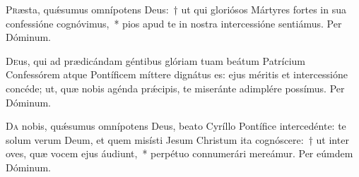 \documentclass[vesperale_romanum.tex]{subfiles}
\begin{document}
\myrule


\semiduplex


\oratio

\lettrine{P}{r}æsta, quǽsumus omnípotens Deus:~† ut qui gloriósos Mártyres fortes in sua confessióne cognóvimus,~* pios apud te in nostra intercessióne sentiámus. Per Dóminum.

\commferiae

\myrule


\duplex


\oratio

\commferiae

\myrule

\newpage


\duplex

\oratio

\lettrine{D}{e}us, qui ad prædicándam géntibus glóriam tuam beátum Patrícium Confessórem atque Pontíficem míttere dignátus es: ejus méritis et intercessióne concéde; ut, quæ nobis agénda prǽcipis, te miseránte adimplére possímus. Per Dóminum.

\commferiae

\capitdeseqcommfer

\myrule


\duplex


\oratio

\lettrine{D}{a} nobis, quǽsumus omnípotens Deus, beato Cyríllo Pontífice intercedénte: te solum verum Deum, et quem misísti Jesum Christum ita cognóscere:~† ut inter oves, quæ vocem ejus áudiunt,~* perpétuo connumerári mereámur. Per eúmdem Dóminum.
\end{document}
